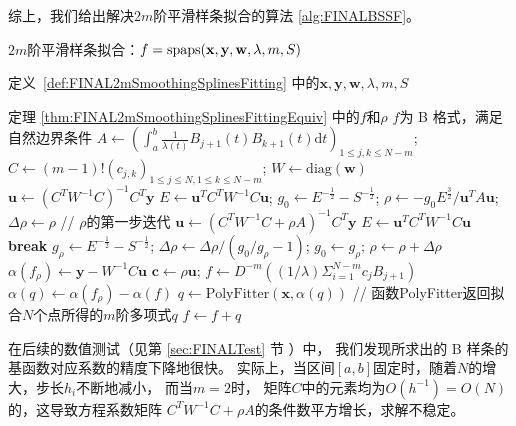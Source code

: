 综上，我们给出解决$2m$阶平滑样条拟合的算法 \ref{alg:FINALBSSF}。
\begin{algorithm}[htb]
\caption{$2m$阶平滑样条拟合：$f=\textnormal{spaps}(\mathbf{x}, \mathbf{y}, \mathbf{w}, \lambda, m,S)$}
\label{alg:FINALBSSF}
\begin{algorithmic}[1] 
  \renewcommand{\algorithmicrequire}{ \textbf{Input:}} %
  \REQUIRE  %
  定义~\ref{def:FINAL2mSmoothingSplinesFitting} 中的$\mathbf{x}, \mathbf{y}, \mathbf{w}, \lambda, m,S$
    
      \renewcommand{\algorithmicrequire}{ \textbf{Preconditions:}} %
      
    \renewcommand{\algorithmicensure}{ \textbf{Output:}} %
  \ENSURE  %
  定理 \ref{thm:FINAL2mSmoothingSplinesFittingEquiv} 中的$f$和$\rho$
\renewcommand{\algorithmicensure}{ \textbf{Postconditions:}} %
\ENSURE  %
    $f$为 B 格式，满足自然边界条件
    \STATE $A\leftarrow (\int_{a}^{b}\frac{1}{\lambda(t)}B_{j+1}(t)B_{k+1}(t)\mathrm{d}t)_{1\le j,k\le N-m}$;  
             $C\leftarrow (m-1)!(c_{j,k})_{1\le j\le N,1\le k\le N-m}$;
             $W\leftarrow \text{diag}(\mathbf{w})$
    \STATE $\mathbf{u}\leftarrow(C^{T}W^{-1}C)^{-1}C^{T}\mathbf{y}$
    \STATE $E\leftarrow \mathbf{u}^{T}C^{T}W^{-1}C\mathbf{u}$;
     $g_{0}\leftarrow E^{-\frac{1}{2}}-S^{-\frac{1}{2}}$;
     $\rho\leftarrow -g_{0}E^{\frac{3}{2}}/\mathbf{u}^{T}A\mathbf{u}$; $\Delta \rho\leftarrow\rho$
     \hfill // $\rho$的第一步迭代
    \STATE $\mathbf{u}\leftarrow(C^{T}W^{-1}C+\rho A)^{-1}C^{T}\mathbf{y}$
    \STATE $E\leftarrow \mathbf{u}^{T}C^{T}W^{-1}C\mathbf{u}$
        \STATE \textbf{break}
    \ENDIF
    \STATE $g_{\rho}\leftarrow {E}^{-\frac{1}{2}} - S^{-\frac{1}{2}}$;
     $\Delta\rho\leftarrow \Delta\rho / (g_{0}/g_{\rho} - 1)$;
     $g_{0} \leftarrow g_{\rho}$;
     $\rho \leftarrow\rho + \Delta\rho$
     \ENDWHILE
     \STATE $\alpha(f_{\rho})\leftarrow \mathbf{y}-W^{-1}C\mathbf{u}$
     \STATE $\mathbf{c}\leftarrow \rho \mathbf{u}$;
     $f\leftarrow D^{-m}((1/\lambda)\Sigma_{i=1}^{N-m}c_{j}B_{j+1})$
     \STATE $\alpha(q)\leftarrow \alpha(f_{\rho})-\alpha(f)$
     \STATE $q\leftarrow \text{PolyFitter}(\mathbf{x},\alpha(q))$
     \hfill // 函数PolyFitter返回拟合$N$个点所得的$m$阶多项式$q$
     \STATE $f\leftarrow f+q$
\end{algorithmic}
\end{algorithm}

在后续的数值测试（见第 \ref{sec:FINALTest} 节 ）中，
我们发现所求出的 B 样条的基函数对应系数的精度下降地很快。
实际上，当区间$[a,b]$固定时，随着$N$的增大，步长$h_{i}$不断地减小，
而当$m=2$时，
矩阵$C$中的元素均为$O(h^{-1})=O(N)$的，这导致方程系数矩阵
$C^{T}W^{-1}C+\rho A$的条件数平方增长，求解不稳定。
